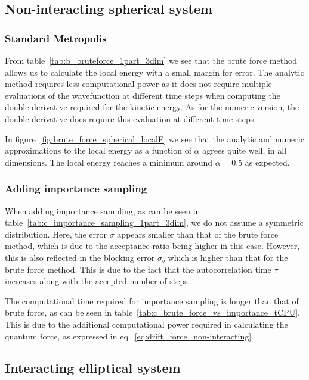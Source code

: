 \documentclass[
    a4paper, aps, twocolumn, floatfix, superscriptaddress,
    nofootinbib]{revtex4-1}
\begin{document}
\subsection{Non-interacting spherical system}
\subsubsection{Standard Metropolis}
From table~\ref{tab:b_bruteforce_1part_3dim} we see that the brute force method allows us to calculate the local energy with a small margin for error. The analytic method requires less computational power as it does not require multiple evaluations of the wavefunction at different time steps when computing the double derivative required for the kinetic energy. As for the numeric version, the double derivative does require this evaluation at different time steps.

In figure~\ref{fig:brute_force_spherical_localE} we see that the analytic and numeric approximations to the local energy as a function of $\alpha$ agrees quite well, in all dimensions. The local energy reaches a minimum around $\alpha = 0.5$ as expected.

\subsubsection{Adding importance sampling}
When adding importance sampling, as can be seen in table~\ref{tab:c_importance_sampling_1part_3dim}, we do not assume a symmetric distribution. Here, the error $\sigma$ appears smaller than that of the brute force method, which is due to the acceptance ratio being higher in this case. However, this is also reflected in the blocking error $\sigma_b$ which is higher than that for the brute force method. This is due to the fact that the autocorrelation time $\tau$ increases along with the accepted number of steps.

The computational time required for importance sampling is longer than that of brute force, as can be seen in table~\ref{tab:c_brute_force_vs_importance_tCPU}. This is due to the additional computational power required in calculating the quantum force, as expressed in eq.~\eqref{eq:drift_force_non-interacting}.

\subsection{Interacting elliptical system}
\end{document}
